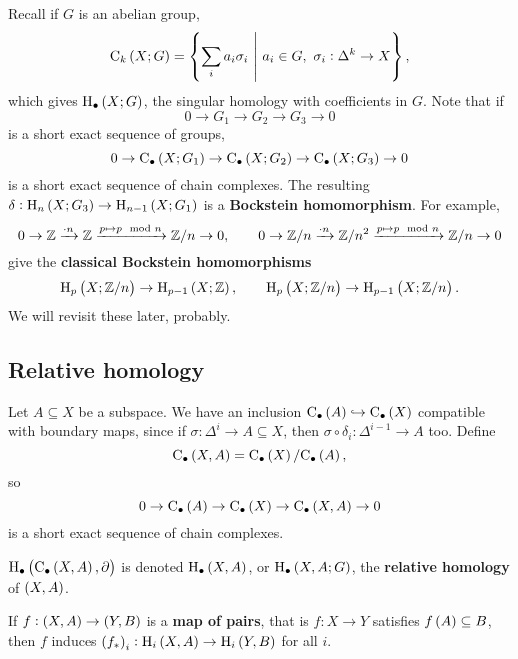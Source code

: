 \begin{example*}
Recall if $ G $ is an abelian group,
$$ \C_k\br{X; G} = \cbr{\sum_i a_i\sigma_i \st a_i \in G, \ \sigma_i : \Delta^k \to X}, $$
which gives $ \H_\bullet\br{X; G} $, the singular homology with coefficients in $ G $. Note that if
$$ 0 \to G_1 \to G_2 \to G_3 \to 0 $$
is a short exact sequence of groups,
$$ 0 \to \C_\bullet\br{X; G_1} \to \C_\bullet\br{X; G_2} \to \C_\bullet\br{X; G_3} \to 0 $$
is a short exact sequence of chain complexes. The resulting $ \delta : \H_n\br{X; G_3} \to \H_{n - 1}\br{X; G_1} $ is a \textbf{Bockstein homomorphism}. For example,
$$ 0 \to \mathbb{Z} \xrightarrow{\cdot n} \mathbb{Z} \xrightarrow{p \mapsto p \mod n} \mathbb{Z} / n \to 0, \qquad 0 \to \mathbb{Z} / n \xrightarrow{\cdot n} \mathbb{Z} / n^2 \xrightarrow{p \mapsto p \mod n} \mathbb{Z} / n \to 0 $$
give the \textbf{classical Bockstein homomorphisms}
$$ \H_p\br{X; \ZZ / n} \to \H_{p - 1}\br{X; \ZZ}, \qquad \H_p\br{X; \ZZ / n} \to \H_{p - 1}\br{X; \ZZ / n}. $$
We will revisit these later, probably.
\end{example*}

\subsection{Relative homology}

\begin{example*}
Let $ A \subseteq X $ be a subspace. We have an inclusion $ \C_\bullet\br{A} \hookrightarrow \C_\bullet\br{X} $ compatible with boundary maps, since if $ \sigma : \Delta^i \to A \subseteq X $, then $ \sigma \circ \delta_i : \Delta^{i - 1} \to A $ too. Define
$$ \C_\bullet\br{X, A} = \C_\bullet\br{X} / \C_\bullet\br{A}, $$
so
$$ 0 \to \C_\bullet\br{A} \to \C_\bullet\br{X} \to \C_\bullet\br{X, A} \to 0 $$
is a short exact sequence of chain complexes.
\end{example*}

\begin{definition*}
$ \H_\bullet\br{\C_\bullet\br{X, A}, \da} $ is denoted $ \H_\bullet\br{X, A} $, or $ \H_\bullet\br{X, A; G} $, the \textbf{relative homology} of $ \br{X, A} $.
\end{definition*}

\pagebreak

\begin{lemma}
If $ f : \br{X, A} \to \br{Y, B} $ is a \textbf{map of pairs}, that is $ f : X \to Y $ satisfies $ f\br{A} \subseteq B $, then $ f $ induces $ \br{f_*}_i : \H_i\br{X, A} \to \H_i\br{Y, B} $ for all $ i $.
\end{lemma}

